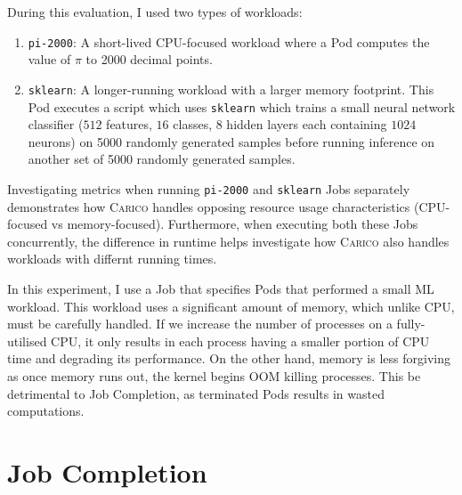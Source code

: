 During this evaluation, I used two types of workloads:
\begin{enumerate}
    \item \texttt{pi-2000}: A short-lived CPU-focused workload where a Pod
        computes the value of $\pi$ to 2000 decimal points.
    \item \texttt{sklearn}: A longer-running workload with a larger memory
        footprint. This Pod executes a script which uses
        \texttt{sklearn} which trains a small neural network classifier ($512$
        features, $16$ classes, $8$ hidden layers each containing $1024$
        neurons) on 5000 randomly generated samples before running inference on
        another set of 5000 randomly generated samples.
\end{enumerate}
Investigating metrics when running \texttt{pi-2000} and \texttt{sklearn} Jobs
separately demonstrates how \textsc{Carico} handles opposing resource usage
characteristics (CPU-focused vs memory-focused). Furthermore, when executing
both these Jobs concurrently, the difference in runtime helps investigate how
\textsc{Carico} also handles workloads with differnt running times.

In this experiment, I use a Job that specifies Pods that performed a small ML
workload. This workload uses a significant amount of memory, which unlike CPU,
must be carefully handled. If we increase the number of processes on a
fully-utilised CPU, it only results in each process having a smaller portion of
CPU time and degrading its performance. On the other hand, memory is less
forgiving as once memory runs out, the kernel begins OOM killing processes. This
be detrimental to Job Completion, as terminated Pods results in wasted
computations.


\section{Job Completion}
\label{sec:eval-job-completion}

